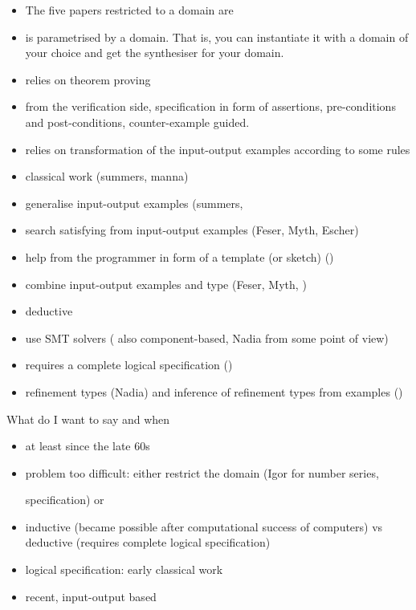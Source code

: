 \begin{itemize}
\item The five papers restricted to a domain are %
\item \cite{Perelman:2014:TS:2594291.2594297} is parametrised by a domain. That is, you can instantiate it with a domain of your choice and get the synthesiser for your domain.
\item \cite{Manna:1980:DAP:357084.357090} relies on theorem proving
\item from the verification side, specification in form of assertions, pre-conditions and post-conditions, counter-example guided. \cite{LeonPaper, DBLP:journals/corr/InalaQLS15}
\item relies on transformation of the input-output examples according to some rules %
\item classical work (summers, manna)
\item generalise input-output examples (summers, \cite{Gulwani:2011:ASP:1926385.1926423}
\item search satisfying from input-output examples (Feser, Myth, Escher)
\item help from the programmer in form of a template (or sketch) (\cite{Solar-Lezama:2006:CSF:1168857.1168907})
\item combine input-output examples and type (Feser, Myth, \cite{Jha:2010:OCP:1806799.1806833})
\item deductive
\item use SMT solvers (\cite{Jha:2010:OCP:1806799.1806833} also component-based, Nadia from some point of view)
\item requires a complete logical specification (\cite{Kuncak:2010:CFS:1806596.1806632})
\item refinement types (Nadia) and inference of refinement types from examples (\cite{Frankle:2016:EST:2837614.2837629})
\end{itemize}

What do I want to say and when
\begin{itemize}
\item at least since the late 60s
\item problem too difficult: either restrict the domain (Igor for number series, 

specification)
or 
\item inductive (became possible after computational success of computers) vs deductive (requires complete logical specification)
\item logical specification:
early classical work 
\item recent, input-output based
\end{itemize}

